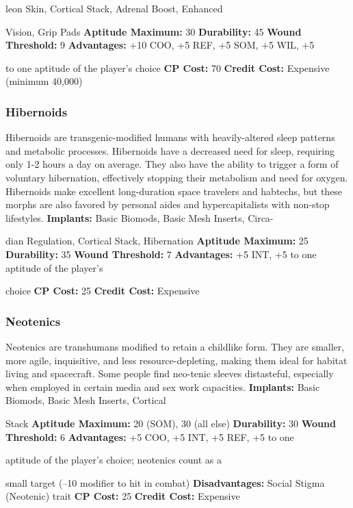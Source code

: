 leon Skin, Cortical Stack, Adrenal Boost, Enhanced 

Vision, Grip Pads
\textbf{Aptitude Maximum: }30
\textbf{Durability:} 45
\textbf{Wound Threshold:} 9
\textbf{Advantages:} +10 COO, +5 REF, +5 SOM, +5 WIL, +5 

to one aptitude of the player's choice
\textbf{CP Cost:} 70
\textbf{Credit Cost: }Expensive (minimum 40,000)

\subsubsection{Hibernoids}

Hibernoids are transgenic-modified humans with 
heavily-altered sleep patterns and metabolic processes. 
Hibernoids have a decreased need for sleep, requiring 
only 1-2 hours a day on average. They also have the 
ability to trigger a form of voluntary hibernation, 
effectively stopping their metabolism and need for 
oxygen. Hibernoids make excellent long-duration 
space travelers and habtechs, but these morphs are 
also favored by personal aides and hypercapitalists 
with non-stop lifestyles.
\textbf{Implants: }Basic Biomods, Basic Mesh Inserts, Circa-

dian Regulation, Cortical Stack, Hibernation
\textbf{Aptitude Maximum: }25
\textbf{Durability: }35
\textbf{Wound Threshold: }7
\textbf{Advantages: }+5 INT, +5 to one aptitude of the player's 

choice
\textbf{CP Cost:} 25
\textbf{Credit Cost: }Expensive

\subsubsection{Neotenics}

Neotenics are transhumans modified to retain a childlike
form. They are smaller, more agile, inquisitive,
and less resource-depleting, making them ideal for 
habitat living and spacecraft. Some people find neo-tenic
sleeves distasteful, especially when employed in
certain media and sex work capacities.
\textbf{Implants: }Basic Biomods, Basic Mesh Inserts, Cortical 

Stack
\textbf{Aptitude Maximum: }20 (SOM), 30 (all else)
\textbf{Durability: }30
\textbf{Wound Threshold: }6
\textbf{Advantages:  }+5 COO, +5 INT, +5 REF, +5 to one 

aptitude of the player's choice; neotenics count as a 

small target (–10 modifier to hit in combat)
\textbf{Disadvantages: }Social Stigma (Neotenic) trait
\textbf{CP Cost:} 25
\textbf{Credit Cost: }Expensive


